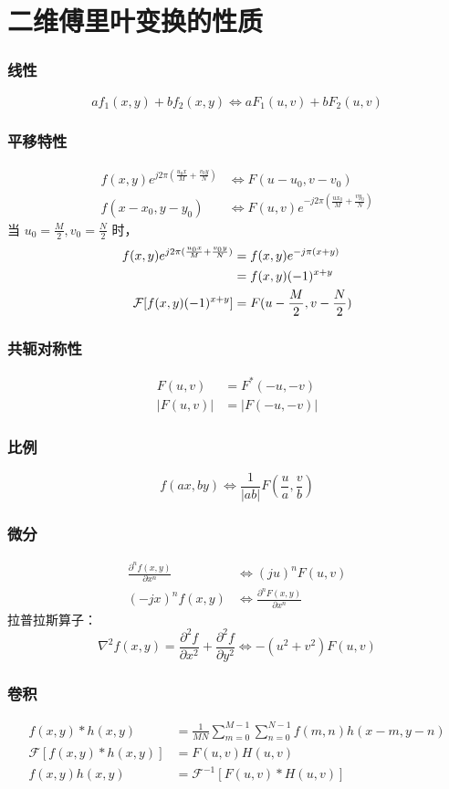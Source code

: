 \documentclass{beamer}
\begin{document}
\section{二维傅里叶变换的性质}
\label{sec-4}
\begin{frame}
\frametitle{线性}
\label{sec-4-1}

\[af_1 (x,y)+bf_2(x,y) \Leftrightarrow aF_1(u,v)+bF_2(u,v) \]
\end{frame}
\begin{frame}
\frametitle{平移特性}
\label{sec-4-2}

\begin{align*}
f(x,y)e^{j2\pi(\frac{u_0 x}{M}+\frac{v_0 y}{N})} &\Leftrightarrow F(u-u_0,v-v_0) \\
f(x-x_0,y-y_0) &\Leftrightarrow F(u,v)e^{-j2\pi(\frac{u x_0}{M}+\frac{v y_0}{N})}
\end{align*}
当 $u_0=\frac{M}{2},v_0=\frac{N}{2}$ 时，
\begin{align*}
f(x,y)e^{j2\pi(\frac{u_0 x}{M}+\frac{v_0 y}{N})} &= f(x,y)e^{-j\pi(x+y)} \\
&=f(x,y)(-1)^{x+y} \\
{\cal F}[f(x,y)(-1)^{x+y}] &= F(u-\frac{M}{2},v-\frac{N}{2})
\end{align*}
\end{frame}
\begin{frame}
\frametitle{共轭对称性}
\label{sec-4-3}

\begin{align*}
F(u,v)&=F^{*}(-u,-v)\\
|F(u,v)|&=|F(-u,-v)|
\end{align*}
\end{frame}
\begin{frame}
\frametitle{比例}
\label{sec-4-4}

\[f(ax,by) \Leftrightarrow \frac{1}{|ab|}F(\frac{u}{a},\frac{v}{b})\]
\end{frame}
\begin{frame}
\frametitle{微分}
\label{sec-4-5}

\begin{align*}
\frac{\partial^n f(x,y)}{\partial x^n} &\Leftrightarrow (ju)^n F(u,v) \\
(-jx)^n f(x,y) &\Leftrightarrow \frac{\partial^n F(x,y)}{\partial x^n}
\end{align*}
拉普拉斯算子：
\[\nabla^2 f(x,y) =\frac{\partial^2 f}{\partial x^2}+\frac{\partial^2 f}{\partial y^2} \Leftrightarrow -(u^2+v^2)F(u,v)  \]
\end{frame}
\begin{frame}
\frametitle{卷积}
\label{sec-4-6}

\begin{align*}
f(x,y)*h(x,y) &= \frac{1}{MN}\sum_{m=0}^{M-1}\sum_{n=0}^{N-1}f(m,n)h(x-m,y-n) \\
\mathcal{F}[f(x,y)*h(x,y)] &= F(u,v)H(u,v)\\
f(x,y)h(x,y) &= \mathcal{F}^{-1}[F(u,v)*H(u,v)]
\end{align*}
\end{frame}
\end{document}
